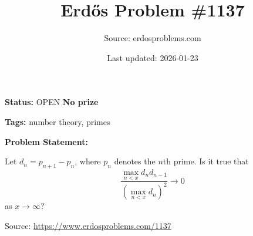 \documentclass{article}
\title{Erd\H{o}s Problem \#1137}
\date{Last updated: 2026-01-23}
\author{Source: erdosproblems.com}
\begin{document}
\maketitle

\noindent\textbf{Status:} OPEN \quad \textbf{No prize}

\noindent\textbf{Tags:} number theory, primes

\medskip
\noindent\textbf{Problem Statement:}

Let $d_n=p_{n+1}-p_n$, where $p_n$ denotes the $n$th prime. Is it true that\[\frac{\max_{n<x}d_{n}d_{n-1}}{(\max_{n<x}d_n)^2}\to 0\]as $x\to \infty$?

\bigskip
\noindent\small{Source: \url{https://www.erdosproblems.com/1137}}
\end{document}
